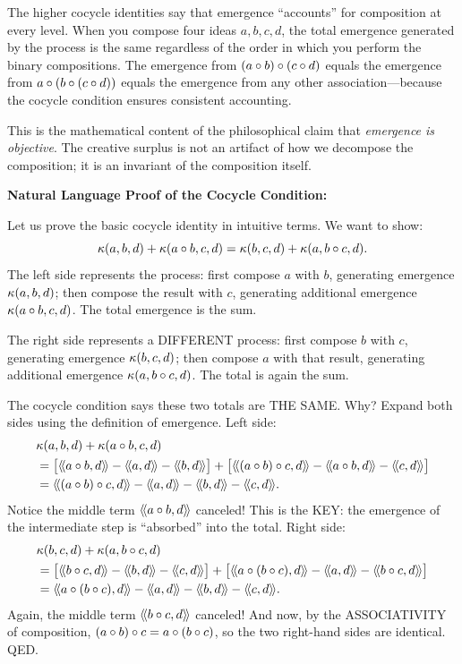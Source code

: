 \begin{interpretation}
The higher cocycle identities say that emergence ``accounts'' for composition
at every level. When you compose four ideas $a, b, c, d$, the total emergence
generated by the process is the same regardless of the order in which you
perform the binary compositions. The emergence from $(a \circ b) \circ (c \circ d)$
equals the emergence from $a \circ (b \circ (c \circ d))$ equals the
emergence from any other association---because the cocycle condition ensures
consistent accounting.

This is the mathematical content of the philosophical claim that \emph{emergence
is objective}. The creative surplus is not an artifact of how we decompose the
composition; it is an invariant of the composition itself.

\textbf{Natural Language Proof of the Cocycle Condition:}

Let us prove the basic cocycle identity in intuitive terms. We want to show:
\[
  \kappa(a,b,d) + \kappa(a \circ b, c, d) = \kappa(b,c,d) + \kappa(a, b \circ c, d).
\]
The left side represents the process: first compose $a$ with $b$, generating
emergence $\kappa(a,b,d)$; then compose the result with $c$, generating additional
emergence $\kappa(a \circ b, c, d)$. The total emergence is the sum.

The right side represents a DIFFERENT process: first compose $b$ with $c$,
generating emergence $\kappa(b,c,d)$; then compose $a$ with that result,
generating additional emergence $\kappa(a, b \circ c, d)$. The total is
again the sum.

The cocycle condition says these two totals are THE SAME. Why? Expand both sides
using the definition of emergence. Left side:
\begin{align*}
&\emerge(a,b,d) + \emerge(a \compose b, c, d) \\
&= \bigl[\rs{a \compose b}{d} - \rs{a}{d} - \rs{b}{d}\bigr]
  + \bigl[\rs{(a \compose b) \compose c}{d} - \rs{a \compose b}{d} - \rs{c}{d}\bigr] \\
&= \rs{(a \compose b) \compose c}{d} - \rs{a}{d} - \rs{b}{d} - \rs{c}{d}.
\end{align*}
Notice the middle term $\langle\!\langle a \circ b, d \rangle\!\rangle$ canceled! This is the KEY: the
emergence of the intermediate step is ``absorbed'' into the total. Right side:
\begin{align*}
&\emerge(b,c,d) + \emerge(a, b \compose c, d) \\
&= \bigl[\rs{b \compose c}{d} - \rs{b}{d} - \rs{c}{d}\bigr]
  + \bigl[\rs{a \compose (b \compose c)}{d} - \rs{a}{d} - \rs{b \compose c}{d}\bigr] \\
&= \rs{a \compose (b \compose c)}{d} - \rs{a}{d} - \rs{b}{d} - \rs{c}{d}.
\end{align*}
Again, the middle term $\langle\!\langle b \circ c, d \rangle\!\rangle$ canceled! And now, by the
ASSOCIATIVITY of composition, $(a \circ b) \circ c = a \circ (b \circ c)$,
so the two right-hand sides are identical. QED.


\end{interpretation}
